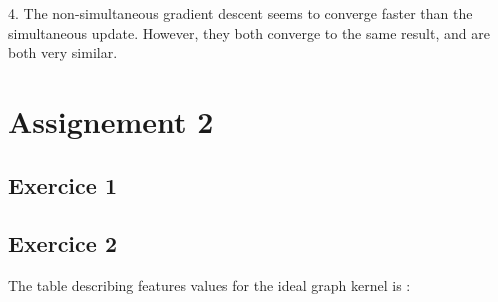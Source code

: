 \documentclass{article}
\begin{document}
    4. The non-simultaneous gradient descent seems to converge faster than the simultaneous update.
    However, they both converge to the same result, and are both very similar. \\

    \section{Assignement 2}

    \subsection{Exercice 1}

    \subsection{Exercice 2}

    The table describing features values for the ideal graph kernel is :
\end{document}
